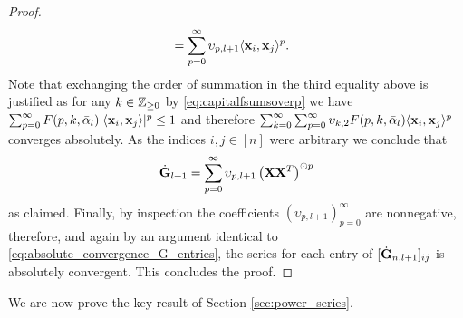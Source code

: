\begin{proof}
\[\begin{aligned}
        & = \sum_{p=0}^{\infty} \upsilon_{p, l+1}\langle \mathbf x_i, \mathbf x_j \rangle^p.
    \end{aligned}
    \]
    Note that exchanging the order of summation in the third equality above is justified as for any $k \in \mathbb{Z}_{\geq 0}$ by \eqref{eq:capitalfsumsoverp} we have $\sum_{p=0}^{\infty} F(p,k,\bar{\alpha}_{l}) |\langle \mathbf x_i, \mathbf x_j \rangle|^p \leq 1$ and therefore $\sum_{k=0}^\infty \sum_{p=0}^{\infty}\upsilon_{k,2} F(p,k,\bar{\alpha}_{l}) \langle \mathbf x_i, \mathbf x_j \rangle^p$ converges absolutely. As the indices $i,j \in [n]$ were arbitrary we conclude that
    \[
        \dot{\mathbf{G}}_{l+1} = \sum_{p=0}^{\infty} \upsilon_{p, l+1} \left(\mathbf{X} \mathbf{X}^T \right)^{\odot p}
    \]
    as claimed. Finally, by inspection the coefficients $(\upsilon_{p,l+1})_{p=0}^{\infty}$ are nonnegative, therefore, and again by an argument identical to \eqref{eq:absolute_convergence_G_entries}, the series for each entry of $[\dot{\mathbf{G}}_{n,l+1}]_{ij}$ is absolutely convergent. This concludes the proof.
\end{proof}


We are now prove the key result of Section \ref{sec:power_series}.

\ntkPowerSeries* 

